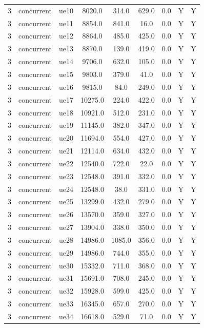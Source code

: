 \begin{table}[ht]
\begin{tabular}{|c|c|c|c|c|c|c|c|c|}
3 & concurrent & ue10 & 8020.0 & 314.0 & 629.0 & 0.0 & Y & Y \\
3 & concurrent & ue11 & 8854.0 & 841.0 & 16.0 & 0.0 & Y & Y \\
3 & concurrent & ue12 & 8864.0 & 485.0 & 425.0 & 0.0 & Y & Y \\
3 & concurrent & ue13 & 8870.0 & 139.0 & 419.0 & 0.0 & Y & Y \\
3 & concurrent & ue14 & 9706.0 & 632.0 & 105.0 & 0.0 & Y & Y \\
3 & concurrent & ue15 & 9803.0 & 379.0 & 41.0 & 0.0 & Y & Y \\
3 & concurrent & ue16 & 9815.0 & 84.0 & 249.0 & 0.0 & Y & Y \\
3 & concurrent & ue17 & 10275.0 & 224.0 & 422.0 & 0.0 & Y & Y \\
3 & concurrent & ue18 & 10921.0 & 512.0 & 231.0 & 0.0 & Y & Y \\
3 & concurrent & ue19 & 11145.0 & 382.0 & 347.0 & 0.0 & Y & Y \\
3 & concurrent & ue20 & 11694.0 & 554.0 & 427.0 & 0.0 & Y & Y \\
3 & concurrent & ue21 & 12114.0 & 634.0 & 432.0 & 0.0 & Y & Y \\
3 & concurrent & ue22 & 12540.0 & 722.0 & 22.0 & 0.0 & Y & Y \\
3 & concurrent & ue23 & 12548.0 & 391.0 & 332.0 & 0.0 & Y & Y \\
3 & concurrent & ue24 & 12548.0 & 38.0 & 331.0 & 0.0 & Y & Y \\
3 & concurrent & ue25 & 13299.0 & 432.0 & 279.0 & 0.0 & Y & Y \\
3 & concurrent & ue26 & 13570.0 & 359.0 & 327.0 & 0.0 & Y & Y \\
3 & concurrent & ue27 & 13904.0 & 338.0 & 350.0 & 0.0 & Y & Y \\
3 & concurrent & ue28 & 14986.0 & 1085.0 & 356.0 & 0.0 & Y & Y \\
3 & concurrent & ue29 & 14986.0 & 744.0 & 355.0 & 0.0 & Y & Y \\
3 & concurrent & ue30 & 15332.0 & 711.0 & 368.0 & 0.0 & Y & Y \\
3 & concurrent & ue31 & 15691.0 & 708.0 & 245.0 & 0.0 & Y & Y \\
3 & concurrent & ue32 & 15928.0 & 599.0 & 425.0 & 0.0 & Y & Y \\
3 & concurrent & ue33 & 16345.0 & 657.0 & 270.0 & 0.0 & Y & Y \\
3 & concurrent & ue34 & 16618.0 & 529.0 & 71.0 & 0.0 & Y & Y \\

\end{tabular}
\end{table}
